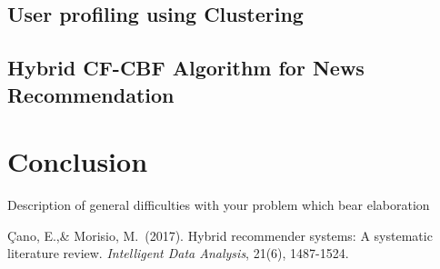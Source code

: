 \documentclass{article}
\begin{document}
\subsection{User profiling using Clustering}

\subsection{Hybrid CF-CBF Algorithm for News Recommendation}

\section{Conclusion}

{Description of general difficulties with your problem which bear elaboration
}

\begin{thebibliography}{9}

 Çano, E.,\& Morisio, M.\ (2017). Hybrid recommender systems: A systematic literature review. {\it Intelligent Data Analysis}, 21(6), 1487-1524.
\end{thebibliography}
\end{document}
